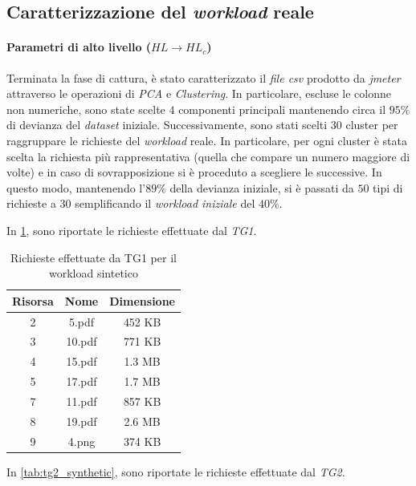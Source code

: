 \subsection{Caratterizzazione del \textit{workload} reale}

\paragraph{Parametri di alto livello ($HL \rightarrow HL_c$)}
Terminata la fase di cattura, è stato caratterizzato il \textit{file csv} prodotto da \textit{jmeter} attraverso le operazioni di \textit{PCA} e \textit{Clustering}. In particolare, escluse le colonne non numeriche, sono state scelte $4$ componenti principali mantenendo circa il $95\%$ di devianza del \textit{dataset} iniziale. Successivamente, sono stati scelti $30$ cluster per raggruppare le richieste del \textit{workload} reale. In particolare, per ogni cluster è stata scelta la richiesta più rappresentativa (quella che compare un numero maggiore di volte) e in caso di sovrapposizione si è proceduto a scegliere le successive. In questo modo, mantenendo l'$89\%$ della devianza iniziale, si è passati da $50$ tipi di richieste a $30$ semplificando il \textit{workload iniziale} del $40\%$.


In \cref{tab:tg1_synthetic}, sono riportate le richieste effettuate dal \textit{TG1}.

\begin{table}[H]
\centering
    \begin{tabular}{|c|c|c|}
    \hline
    \multicolumn{1}{|c|}{\textbf{Risorsa}} &
    \multicolumn{1}{|c|}{\textbf{Nome}} &
    \multicolumn{1}{|c|}{\textbf{Dimensione}}
    \tabularnewline \hline

2 & 5.pdf & 452 KB \tabularnewline \hline
3 & 10.pdf & 771 KB \tabularnewline \hline
4 & 15.pdf & 1.3 MB \tabularnewline \hline
5 & 17.pdf & 1.7 MB \tabularnewline \hline
7 & 11.pdf & 857 KB \tabularnewline \hline
8 & 19.pdf & 2.6 MB \tabularnewline \hline
9 & 4.png & 374 KB \tabularnewline \hline
\end{tabular}
\caption{Richieste effettuate da TG1 per il workload sintetico}
\label{tab:tg1_synthetic}
\end{table}

In \cref{tab:tg2_synthetic}, sono riportate le richieste effettuate dal \textit{TG2}.

